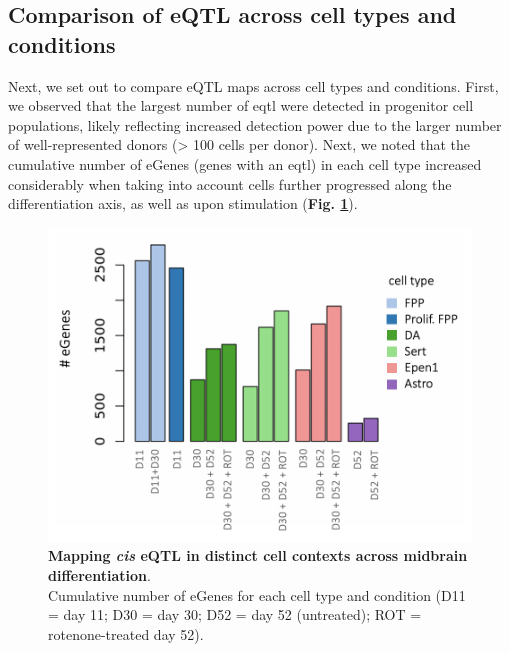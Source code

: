 

\clearpage

\subsection{Comparison of eQTL across cell types and conditions}

Next, we set out to compare eQTL maps across cell types and conditions.
First, we observed that the largest number of \gls{eqtl} were detected in progenitor cell populations, likely reflecting increased detection power due to the larger number of well-represented donors (> 100 cells per donor). 
Next, we noted that the cumulative number of eGenes (genes with an \gls{eqtl}) in each cell type increased considerably when taking into account cells further progressed along the differentiation axis, as well as upon stimulation (\textbf{Fig. \ref{fig:neuroseq_eqtl}}). 


\begin{figure}[h]
\centering
\includegraphics[width=14cm]{Chapter5/Fig/neuroseq_eqtl_cumulative.png}
\caption[Mapping eQTL across neuronal cell types]{\textbf{Mapping \textit{cis} eQTL in distinct cell contexts across midbrain differentiation}.\\
Cumulative number of eGenes for each cell type and condition (D11 = day 11; D30 = day 30; D52 = day 52 (untreated); ROT = rotenone-treated day 52).}
\label{fig:neuroseq_eqtl}
\end{figure}


